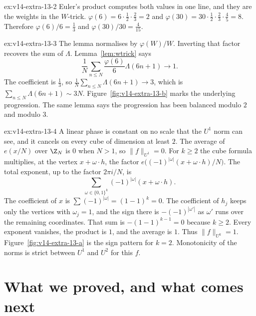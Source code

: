 \begin{solution}{ex:v14-extra-13-2}
\idea Euler's product computes both values in one line, and they are the weights in the $W$-trick.
\writeup $\varphi(6)=6\cdot\frac12\cdot\frac23=2$ and $\varphi(30)=30\cdot\frac12\cdot\frac23\cdot\frac45=8$. Therefore $\varphi(6)/6=\frac13$ and $\varphi(30)/30=\frac4{15}$.
\end{solution}

\begin{solution}{ex:v14-extra-13-3}
\idea The lemma normalises by $\varphi(W)/W$. Inverting that factor recovers the sum of $\Lambda$.
\writeup Lemma~\ref{lem:wtrick} says
\[
\frac1N\sum_{n\le N}\frac{\varphi(6)}6\Lambda(6n+1)\to1.
\]
The coefficient is $\frac13$, so $\frac1N\sum_{n\le N}\Lambda(6n+1)\to3$, which is $\sum_{n\le N}\Lambda(6n+1)\sim3N$. Figure~\ref{fig:v14-extra-13-b} marks the underlying progression. The same lemma says the progression has been balanced modulo $2$ and modulo $3$.
\end{solution}

\begin{solution}{ex:v14-extra-13-4}
\idea A linear phase is constant on no scale that the $U^1$ norm can see, and it cancels on every cube of dimension at least $2$.
\writeup The average of $e(x/N)$ over $\Z_N$ is $0$ when $N>1$, so $\|f\|_{U^1}=0$. For $k\ge2$ the cube formula multiplies, at the vertex $x+\omega\cdot h$, the factor $e\bigl((-1)^{|\omega|}(x+\omega\cdot h)/N\bigr)$. The total exponent, up to the factor $2\pi i/N$, is
\[
\sum_{\omega\in\{0,1\}^k}(-1)^{|\omega|}(x+\omega\cdot h).
\]
The coefficient of $x$ is $\sum(-1)^{|\omega|}=(1-1)^k=0$. The coefficient of $h_j$ keeps only the vertices with $\omega_j=1$, and the sign there is $-(-1)^{|\omega'|}$ as $\omega'$ runs over the remaining coordinates. That sum is $-(1-1)^{k-1}=0$ because $k\ge2$. Every exponent vanishes, the product is $1$, and the average is $1$. Thus $\|f\|_{U^k}=1$. Figure~\ref{fig:v14-extra-13-a} is the sign pattern for $k=2$. Monotonicity of the norms is strict between $U^1$ and $U^2$ for this $f$.
\end{solution}

\section{What we proved, and what comes next}

